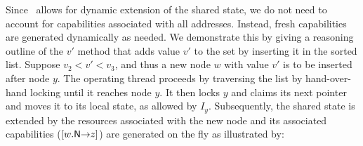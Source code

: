 Since \colosl\ allows for {dynamic} extension of the shared state, we do not need to account for capabilities associated with all addresses. Instead, fresh capabilities are generated dynamically as needed. We demonstrate this by giving a reasoning outline of the $v'$\li{)} method that adds value $v'$ to the set by inserting it in the sorted list.
Suppose $v_2 < v' < v_3$, and thus a new node $w$ with value $v'$ is
to be inserted after node $y$.  The operating thread proceeds by
traversing the list by hand-over-hand locking until it reaches node
$y$. It then locks $y$ and claims its next pointer and moves it to its
local state, as allowed by $I_y$. Subsequently, the shared state is
{extended} by the resources associated with the new node and its
associated capabilities ($[\nextC{w}{z}]$) are generated on the fly as
illustrated by:\vspace{0pt}

